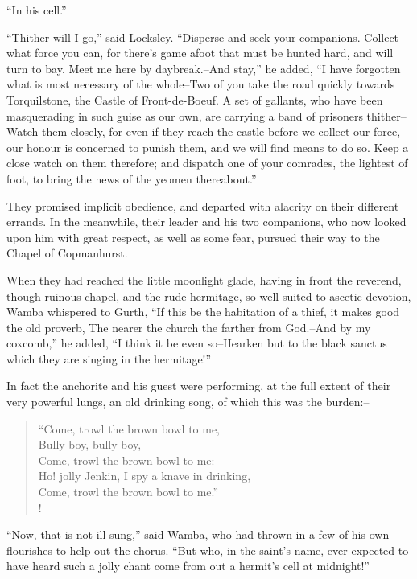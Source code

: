 ``In his cell.''

``Thither will I go,'' said Locksley. ``Disperse and seek your
companions. Collect what force you can, for there's game afoot that must
be hunted hard, and will turn to bay. Meet me here by daybreak.--And
stay,'' he added, ``I have forgotten what is most necessary of the
whole--Two of you take the road quickly towards Torquilstone, the Castle
of Front-de-Boeuf. A set of gallants, who have been masquerading in such
guise as our own, are carrying a band of prisoners thither--Watch them
closely, for even if they reach the castle before we collect our force,
our honour is concerned to punish them, and we will find means to do so.
Keep a close watch on them therefore; and dispatch one of your comrades,
the lightest of foot, to bring the news of the yeomen thereabout.''

They promised implicit obedience, and departed with alacrity on their
different errands. In the meanwhile, their leader and his two
companions, who now looked upon him with great respect, as well as some
fear, pursued their way to the Chapel of Copmanhurst.

When they had reached the little moonlight glade, having in front the
reverend, though ruinous chapel, and the rude hermitage, so well suited
to ascetic devotion, Wamba whispered to Gurth, ``If this be the
habitation of a thief, it makes good the old proverb, The nearer the
church the farther from God.--And by my coxcomb,'' he added, ``I think
it be even so--Hearken but to the black sanctus which they are singing
in the hermitage!''

In fact the anchorite and his guest were performing, at the full extent
of their very powerful lungs, an old drinking song, of which this was
the burden:--

\begin{verse}
``Come, trowl the brown bowl to me,\\
Bully boy, bully boy,\\
Come, trowl the brown bowl to me:\\
Ho! jolly Jenkin, I spy a knave in drinking,\\
Come, trowl the brown bowl to me.''\\!
\end{verse}

``Now, that is not ill sung,'' said Wamba, who had thrown in a few of
his own flourishes to help out the chorus. ``But who, in the saint's
name, ever expected to have heard such a jolly chant come from out a
hermit's cell at midnight!''

